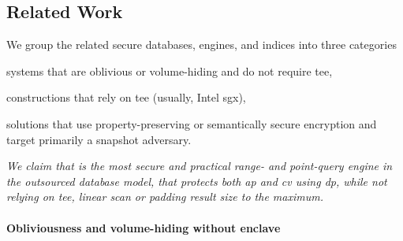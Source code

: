 	\subsection{Related Work}

		We group the related secure databases, engines, and indices into three categories
		\begin{enumerate*}[label={(\roman*)}]
			\item systems that are oblivious or volume-hiding and do not require \acrfull{tee},
			\item constructions that rely on \acrshort{tee} (usually, Intel \acrshort{sgx}),
			\item solutions that use property-preserving or semantically secure encryption and target primarily a snapshot adversary.
		\end{enumerate*}
		\emph{We claim that \epsolute{} is the most secure and practical range- and point-query engine in the outsourced database model, that protects both \acrfull{ap} and \acrfull{cv} using \acrlong{dp}, while not relying on \acrshort{tee}, linear scan or padding result size to the maximum.}

		\paragraph*{Obliviousness and volume-hiding without enclave}

